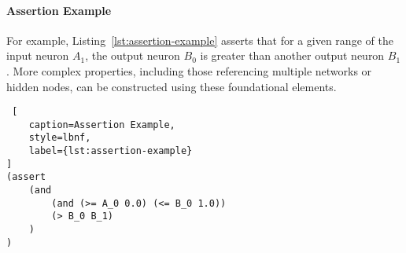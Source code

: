 \paragraph{Assertion Example}
For example, Listing~\ref{lst:assertion-example} asserts that for a given range of the input neuron $A_1$, the output neuron $B_0$ 
is greater than another output neuron $B_1$. More complex properties, including those referencing multiple networks or hidden nodes, 
can be constructed using these foundational elements.

\begin{lstlisting} [
	caption=Assertion Example, 
	style=lbnf,
    label={lst:assertion-example}
]
(assert 
    (and 
        (and (>= A_0 0.0) (<= B_0 1.0)) 
        (> B_0 B_1)
    )
)
\end{lstlisting}
